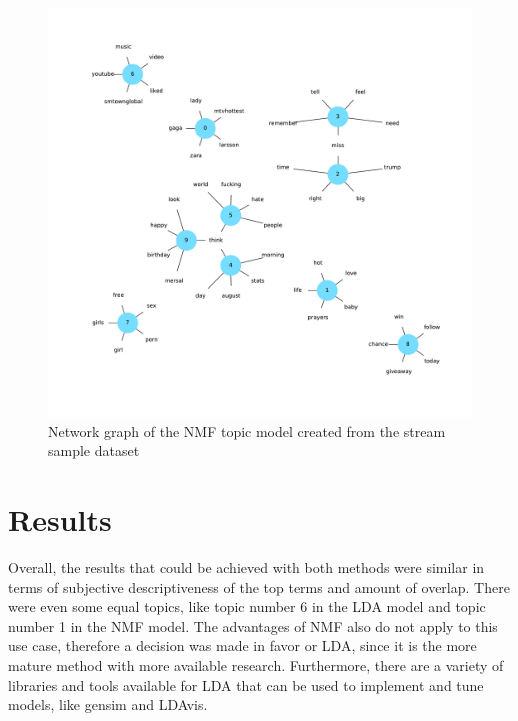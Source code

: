 \begin{figure}
    \centering
    \caption{Network graph of the NMF topic model created from the stream sample dataset}
    \label{fig:nmf_network_graph}
    \includegraphics[width=\textwidth]{../figures/nmf_network_graph.pdf}
\end{figure}

\section{Results}
\label{sec:results}

Overall, the results that could be achieved with both methods were similar in terms of subjective descriptiveness of the top terms and amount of overlap.
There were even some equal topics, like topic number 6 in the LDA model and topic number 1 in the NMF model.
The advantages of NMF also do not apply to this use case, therefore a decision was made in favor or LDA,
since it is the more mature method with more available research.
Furthermore, there are a variety of libraries and tools available for LDA that can be used to implement and tune models,
like gensim and LDAvis.
